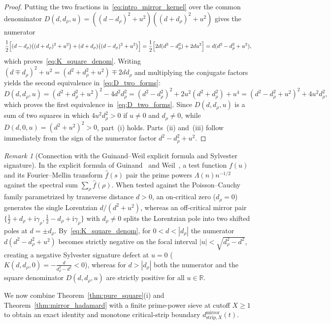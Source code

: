 \documentclass[11pt,reqno]{amsart}
\theoremstyle{definition}
\theoremstyle{remark}
\newtheorem{remark}[theorem]{Remark}
\numberwithin{equation}{section}
\newcommand{\R}{\mathbb{R}}
\newcommand{\ii}{\mathrm{i}}
\begin{document}
\begin{proof}
Putting the two fractions in~\eqref{eq:intro_mirror_kernel} over the common denominator $D(d, d_\rho, u) = ((d - d_\rho)^2 + u^2)((d + d_\rho)^2 + u^2)$ gives the numerator
\[
\frac{1}{2}\Bigl[(d - d_\rho)\bigl((d + d_\rho)^2 + u^2\bigr) + (d + d_\rho)\bigl((d - d_\rho)^2 + u^2\bigr)\Bigr] = \frac{1}{2}\Bigl[2d(d^2 - d_\rho^2) + 2du^2\Bigr] = d(d^2 - d_\rho^2 + u^2),
\]
which proves~\eqref{eq:K_square_denom}. Writing $(d \mp d_\rho)^2 + u^2 = (d^2 + d_\rho^2 + u^2) \mp 2d d_\rho$ and multiplying the conjugate factors yields the second equivalence in~\eqref{eq:D_two_forms}:
\[
D(d, d_\rho, u) = (d^2 + d_\rho^2 + u^2)^2 - 4d^2 d_\rho^2 = (d^2 - d_\rho^2)^2 + 2u^2(d^2 + d_\rho^2) + u^4 = (d^2 - d_\rho^2 + u^2)^2 + 4u^2 d_\rho^2,
\]
which proves the first equivalence in~\eqref{eq:D_two_forms}. Since $D(d, d_\rho, u)$ is a sum of two squares in which $4u^2 d_\rho^2 > 0$ if $u \neq 0$ and $d_\rho \neq 0$, while $D(d, 0, u) = (d^2 + u^2)^2 > 0$, part~(i) holds. Parts~(ii) and~(iii) follow immediately from the sign of the numerator factor $d^2 - d_\rho^2 + u^2$.
\end{proof}

\begin{remark}[Connection with the Guinand--Weil explicit formula and Sylvester signature]\label{rem:guinand_weil}
In the explicit formula of Guinand~\cite{guinand1948} and Weil~\cite{weil1952}, a test function $f(u)$ and its Fourier--Mellin transform $\widehat{f}(s)$ pair the prime powers $\Lambda(n)n^{-1/2}$ against the spectral sum $\sum_\rho \widehat{f}(\rho)$. When tested against the Poisson--Cauchy family parametrized by transverse distance $d > 0$, an on-critical zero ($d_\rho = 0$) generates the single Lorentzian $d/(d^2 + u^2)$, whereas an off-critical mirror pair $\{\frac{1}{2} + d_\rho + \ii\gamma_\rho, \frac{1}{2} - d_\rho + \ii\gamma_\rho\}$ with $d_\rho \neq 0$ splits the Lorentzian pole into two shifted poles at $d = \pm d_\rho$. By~\eqref{eq:K_square_denom}, for $0 < d < |d_\rho|$ the numerator $d(d^2 - d_\rho^2 + u^2)$ becomes strictly negative on the focal interval $|u| < \sqrt{d_\rho^2 - d^2}$, creating a negative Sylvester signature defect at $u = 0$ ($K(d, d_\rho, 0) = -\frac{d}{d_\rho^2 - d^2} < 0$), whereas for $d > |d_\rho|$ both the numerator and the square denominator $D(d, d_\rho, u)$ are strictly positive for all $u \in \R$.
\end{remark}

We now combine Theorem~\ref{thm:pure_square}(i) and Theorem~\ref{thm:mirror_hadamard} with a finite prime-power sieve at cutoff $X \ge 1$ to obtain an exact identity and monotone critical-strip boundary $d_{\mathrm{strip},X}^{\mathrm{mirror}}(t)$.
\end{document}
